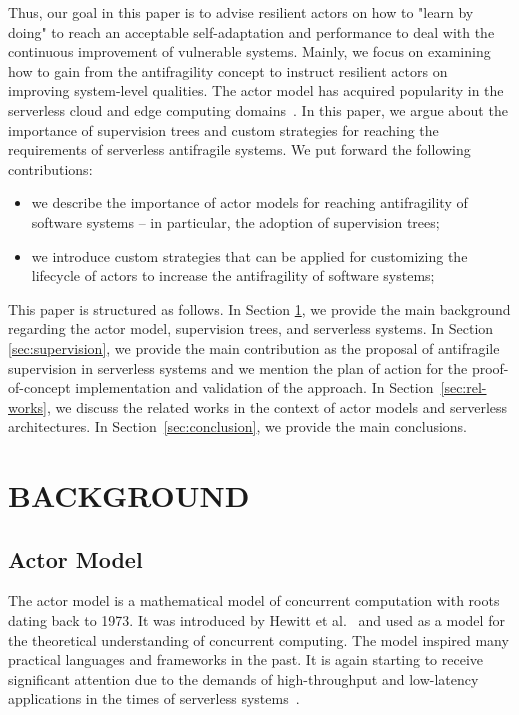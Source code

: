 \documentclass[conference]{IEEEtran}
\begin{document}
Thus, our goal in this paper is to advise resilient actors on how to "learn by doing" to reach an acceptable self-adaptation and performance to deal with the continuous improvement of vulnerable systems. Mainly, we focus on examining how to gain from the antifragility concept to instruct resilient actors on improving system-level qualities.
The actor model has acquired popularity in the serverless cloud and edge computing domains~\cite{barcelona-pons_faas_2019,sreekanti_cloudburst_2020}. In this paper, we argue about the importance of supervision trees and custom strategies for reaching the requirements of serverless antifragile systems. We put forward the following contributions:
\begin{itemize}
   \item we describe the importance of actor models for reaching antifragility of software systems -- in particular, the adoption of supervision trees;
    \item we introduce custom strategies that can be applied for customizing the lifecycle of actors to increase the antifragility of software systems;
\end{itemize}

This paper is structured as follows. In Section \ref{sec:background}, we provide the main background regarding the actor model, supervision trees, and serverless systems. In Section \ref{sec:supervision}, we provide the main contribution as the proposal of antifragile supervision in serverless systems and we mention the plan of action for the proof-of-concept implementation and validation of the approach. In Section~\ref{sec:rel-works}, we discuss the related works in the context of actor models and serverless architectures. In Section~\ref{sec:conclusion}, we provide the main conclusions.

\section{\uppercase{Background}}
\label{sec:background}

\subsection{Actor Model}

The actor model is a mathematical model of concurrent computation with roots dating back to 1973. It was introduced by Hewitt et al.~\cite{hewitt1973session} and used as a model for the theoretical understanding of concurrent computing. The model inspired many practical languages and frameworks in the past. It is again starting to receive significant attention due to the demands of high-throughput and low-latency applications in the times of serverless systems~\cite{taibi2020serverless}.
\end{document}
